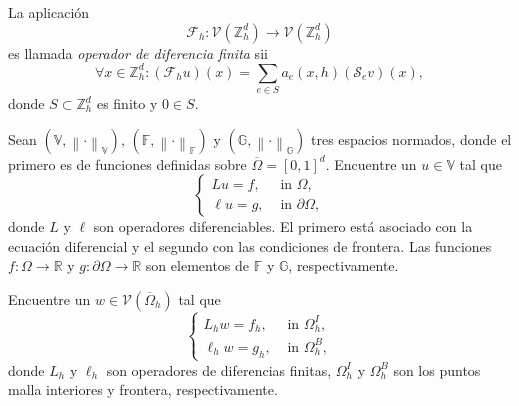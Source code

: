 \begin{definition}
    La aplicación
    \begin{equation*}
        \mathcal{F}_{h}\colon
        \mathcal{V}\left(\mathbb{Z}^{d}_{h}\right)\to
        \mathcal{V}\left(\mathbb{Z}^{d}_{h}\right)
    \end{equation*}
    es llamada \emph{operador de diferencia finita} sii
    \begin{equation*}
        \forall x\in\mathbb{Z}^{d}_{h}:
        \left(\mathcal{F}_{h}u\right)\left(x\right)=
        \sum_{e\in S}
        a_{e}\left(x,h\right)
        \left(\mathcal{S}_{e}v\right)
        \left(x\right),
    \end{equation*}
    donde $S\subset\mathbb{Z}^{d}_{h}$ es finito y $0\in S$.
\end{definition}

Sean
\begin{math}
    \left(
    \mathbb{V},
    {\left\|\cdot\right\|}_{\mathbb{V}}
    \right)
\end{math},
\begin{math}
    \left(
    \mathbb{F},
    {\left\|\cdot\right\|}_{\mathbb{F}}
    \right)
\end{math}
y
\begin{math}
    \left(
    \mathbb{G},
    {\left\|\cdot\right\|}_{\mathbb{G}}
    \right)
\end{math}
tres espacios normados, donde el primero es de funciones definidas
sobre $\overline{\Omega}={\left[0,1\right]}^{d}$.
Encuentre un $u\in\mathbb{V}$ tal que
\begin{equation*}
    \begin{cases}
        Lu=f,     & \text{ in }\Omega,         \\
        \ell u=g, & \text{ in }\partial\Omega,
    \end{cases}
\end{equation*}
donde $L$ y $\ell$ son operadores diferenciables.
El primero está asociado con la ecuación diferencial y el segundo con
las condiciones de frontera.
Las funciones $f\colon\Omega\to\mathbb{R}$ y $g\colon\partial\Omega\to\mathbb{R}$
son elementos de $\mathbb{F}$ y $\mathbb{G}$, respectivamente.

Encuentre un $w\in\mathcal{V}\left(\overline{\Omega}_{h}\right)$ tal
que
\begin{equation*}
    \begin{cases}
        L_{h}w=f_{h},    & \text{ in }\Omega^{I}_{h}, \\
        \ell_{h}w=g_{h}, & \text{ in }\Omega^{B}_{h},
    \end{cases}
\end{equation*}
donde $L_{h}$ y $\ell_{h}$ son operadores de diferencias finitas,
\begin{math}
    \Omega^{I}_{h}
\end{math}
y
\begin{math}
    \Omega^{B}_{h}
\end{math}
son los puntos malla interiores y frontera, respectivamente.

